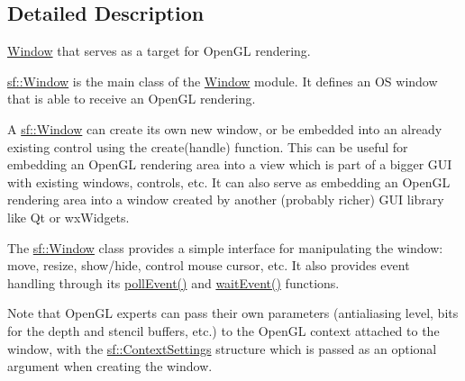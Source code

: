 \subsection{Detailed Description}
\hyperlink{classsf_1_1_window}{Window} that serves as a target for Open\-G\-L rendering. 

\hyperlink{classsf_1_1_window}{sf\-::\-Window} is the main class of the \hyperlink{classsf_1_1_window}{Window} module. It defines an O\-S window that is able to receive an Open\-G\-L rendering.

A \hyperlink{classsf_1_1_window}{sf\-::\-Window} can create its own new window, or be embedded into an already existing control using the create(handle) function. This can be useful for embedding an Open\-G\-L rendering area into a view which is part of a bigger G\-U\-I with existing windows, controls, etc. It can also serve as embedding an Open\-G\-L rendering area into a window created by another (probably richer) G\-U\-I library like Qt or wx\-Widgets.

The \hyperlink{classsf_1_1_window}{sf\-::\-Window} class provides a simple interface for manipulating the window\-: move, resize, show/hide, control mouse cursor, etc. It also provides event handling through its \hyperlink{classsf_1_1_window_a338e996585faf82e93069858e3b531b7}{poll\-Event()} and \hyperlink{classsf_1_1_window_aaf02ab64fbc1d374eef3696df54137bc}{wait\-Event()} functions.

Note that Open\-G\-L experts can pass their own parameters (antialiasing level, bits for the depth and stencil buffers, etc.) to the Open\-G\-L context attached to the window, with the \hyperlink{structsf_1_1_context_settings}{sf\-::\-Context\-Settings} structure which is passed as an optional argument when creating the window.

